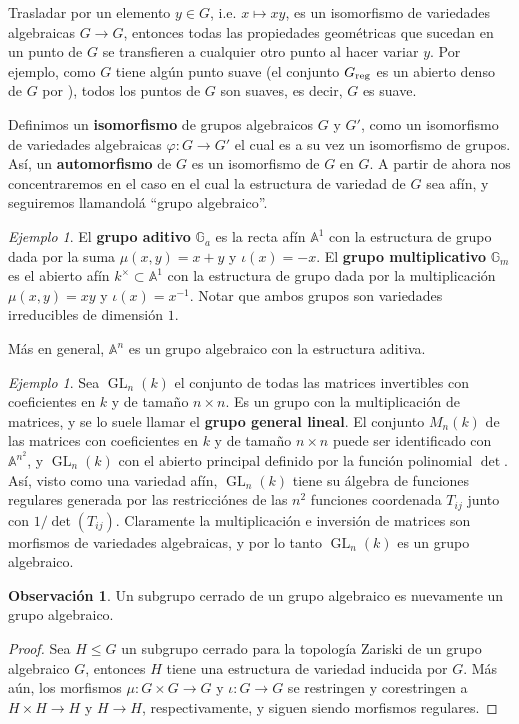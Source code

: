 \documentclass[spanish,10pt]{amsart}
\theoremstyle{definition}
\newtheorem{obs}[theorem]{Observación}
\theoremstyle{remark}
\newtheorem{example}[theorem]{Ejemplo}
\numberwithin{equation}{section}
\newcommand{\afine}[1]{\mathbb{A}^{#1}}
\begin{document}
Trasladar por un elemento $y \in G$, i.e. $x \mapsto x y$, es un isomorfismo de variedades algebraicas $G \to G$, entonces todas las propiedades geométricas que sucedan en un punto de $G$ se transfieren a cualquier otro punto al hacer variar $y$. Por ejemplo, como $G$ tiene algún punto suave (el conjunto $G_{\textup{reg}}$ es un abierto denso de $G$ por \cite[Teorema 2.13.12.]{notas_pedro}), todos los puntos de $G$ son suaves, es decir, $G$ es suave.

Definimos un \textbf{isomorfismo} de grupos algebraicos $G$ y $G'$, como un isomorfismo de variedades algebraicas $\varphi : G \to G'$ el cual es a su vez un isomorfismo de grupos. Así, un \textbf{automorfismo} de $G$ es un isomorfismo de $G$ en $G$. A partir de ahora nos concentraremos en el caso en el cual la estructura de variedad de $G$ sea afín, y seguiremos llamandolá ``grupo algebraico''.

\begin{example}
El \textbf{grupo aditivo} $\mathbb{G}_a$ es la recta afín $\afine 1$ con la estructura de grupo dada por la suma $\mu (x,y) = x + y$ y $\iota (x) = -x$. El \textbf{grupo multiplicativo} $\mathbb{G}_m$ es el abierto afín $k^\times \subset \afine 1$ con la estructura de grupo dada por la multiplicación $\mu (x,y) = xy$ y $\iota (x) = x^{-1}$. Notar que ambos grupos son variedades irreducibles de dimensión $1$.

Más en general, $\afine n$ es un grupo algebraico con la estructura aditiva.
\end{example}

\begin{example}
Sea $\operatorname{GL}_n (k)$ el conjunto de todas las matrices invertibles con coeficientes en $k$ y de tamaño $n \times n$. Es un grupo con la multiplicación de matrices, y se lo suele llamar el \textbf{grupo general lineal}. El conjunto $M_n (k)$ de las matrices con coeficientes en $k$ y de tamaño $n \times n$ puede ser identificado con $\afine {n^2}$, y $\operatorname{GL}_n (k)$ con el abierto principal definido por la función polinomial $\det$. Así, visto como una variedad afín, $\operatorname{GL}_n (k)$ tiene su álgebra de funciones regulares generada por las restricciónes de las $n^2$ funciones coordenada $T_{ij}$ junto con $1 / \det (T_{ij})$. Claramente la multiplicación e inversión de matrices son morfismos de variedades algebraicas, y por lo tanto $\operatorname{GL}_n (k)$ es un grupo algebraico.
\end{example}

\begin{obs}
Un subgrupo cerrado de un grupo algebraico es nuevamente un grupo algebraico.
\end{obs}
\begin{proof}
Sea $H \leq G$ un subgrupo cerrado para la topología Zariski de un grupo algebraico $G$, entonces $H$ tiene una estructura de variedad inducida por $G$. Más aún, los morfismos $\mu : G \times G \to G$ y $\iota : G \to G$ se restringen y corestringen a $H \times H \to H$ y $H \to H$, respectivamente, y siguen siendo morfismos regulares.
\end{proof}
\end{document}
